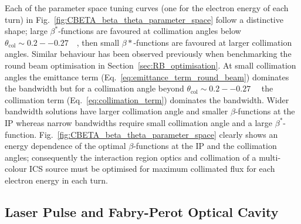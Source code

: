 \documentclass[../main.tex]{subfiles}
\begin{document}
Each of the parameter space tuning curves (one for the electron energy of each turn) in Fig.~\ref{fig:CBETA_beta_theta_parameter_space} follow a distinctive shape; large $\beta^{*}$-functions are favoured at collimation angles below $\theta_{\mathrm{col}}\sim0.2--0.27$~\si{\milli\radians}, then small $\beta*$-functions are favoured at larger collimation angles. Similar behaviour has been observed previously when benchmarking the round beam optimisation in Section~\ref{sec:RB_optimisation}. At small collimation angles the emittance term (Eq.~\ref{eq:emittance_term_round_beam}) dominates the bandwidth but for a collimation angle beyond $\theta_{\mathrm{col}}\sim0.2--0.27$~\si{\milli\radians} the collimation term (Eq.~\ref{eq:collimation_term}) dominates the bandwidth. Wider bandwidth solutions have larger collimation angle and smaller $\beta$-functions at the IP whereas narrow bandwidths require small collimation angle and a large $\beta^{*}$-function. Fig.~\ref{fig:CBETA_beta_theta_parameter_space} clearly shows an energy dependence of the optimal $\beta$-functions at the IP and the collimation angles; consequently the interaction region optics and collimation of a multi-colour ICS source must be optimised for maximum collimated flux for each electron energy in each turn. 

\subsection{Laser Pulse and Fabry-Perot Optical Cavity}
\label{sec:CBETA_laser_parameters}
\end{document}
